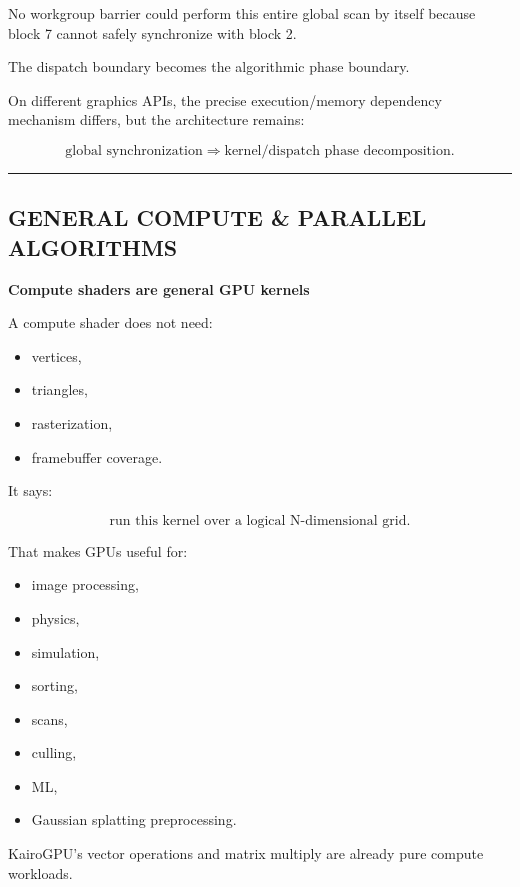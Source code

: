 No workgroup barrier could perform this entire global scan by itself because block 7 cannot safely synchronize with block 2.

The dispatch boundary becomes the algorithmic phase boundary.

On different graphics APIs, the precise execution/memory dependency mechanism differs, but the architecture remains:

\[
\boxed{
\text{global synchronization}
\Rightarrow
\text{kernel/dispatch phase decomposition}.
}
\]

\begin{center}\rule{0.5\linewidth}{0.5pt}\end{center}

\subsection{GENERAL COMPUTE \& PARALLEL ALGORITHMS}\label{03-visual-computing-i-ch016-general-compute-parallel-algorithms}

\textbf{Compute shaders are general GPU kernels}

A compute shader does not need:

\begin{itemize}
\tightlist
\item
  vertices,
\item
  triangles,
\item
  rasterization,
\item
  framebuffer coverage.
\end{itemize}

It says:

\[
\boxed{
\text{run this kernel over a logical N-dimensional grid}.
}
\]

That makes GPUs useful for:

\begin{itemize}
\tightlist
\item
  image processing,
\item
  physics,
\item
  simulation,
\item
  sorting,
\item
  scans,
\item
  culling,
\item
  ML,
\item
  Gaussian splatting preprocessing.
\end{itemize}

KairoGPU's vector operations and matrix multiply are already pure compute workloads.

